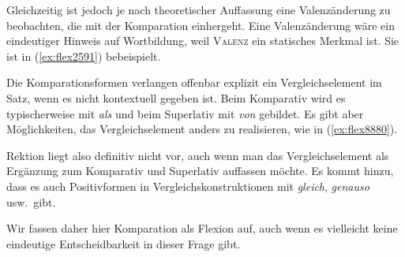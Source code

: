 Gleichzeitig ist jedoch je nach theoretischer Auffassung eine Valenzänderung zu beobachten, die mit der Komparation einhergeht.
Eine Valenzänderung wäre ein eindeutiger Hinweis auf Wortbildung, weil \textsc{Valenz} ein statisches Merkmal ist.
Sie ist in (\ref{ex:flex2591}) bebeispielt.

\begin{exe}
  \ex \label{ex:flex2591}
  \begin{xlist}
  \end{xlist}
\end{exe}


Die Komparationsformen verlangen offenbar explizit ein Vergleichselement im Satz, wenn es nicht kontextuell gegeben ist.
Beim Komparativ wird es typischerweise mit \textit{als} und beim Superlativ mit \textit{von} gebildet.
Es gibt aber Möglichkeiten, das Vergleichselement anders zu realisieren, wie \zB in (\ref{ex:flex8880}).

\begin{exe}
  \ex \label{ex:flex8880}
  \begin{xlist}
  \end{xlist}
\end{exe}

Rektion liegt also definitiv nicht vor, auch wenn man das Vergleichselement als Ergänzung zum Komparativ und Superlativ auffassen möchte.
Es kommt hinzu, dass es auch Positivformen in Vergleichskonstruktionen mit \textit{gleich}, \textit{genauso} usw.\ gibt.

\begin{exe}
  \ex\label{ex:flex7778}
  \begin{xlist}
  \end{xlist}
\end{exe}

Wir fassen daher hier Komparation als Flexion auf, auch wenn es vielleicht keine eindeutige Entscheidbarkeit in dieser Frage gibt.

\Zusammenfassung

